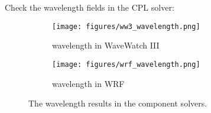 
Check the wavelength fields in the CPL solver:

\begin{figure}[h!]
\centering
  \begin{subfigure}[b]{0.4\linewidth}
  \texttt{[image: figures/ww3\_wavelength.png]}
  \caption{wavelength in WaveWatch III}
  \end{subfigure}
  \begin{subfigure}[b]{0.4\linewidth}
  \texttt{[image: figures/wrf\_wavelength.png]}
  \caption{wavelength in WRF}
  \end{subfigure}
\caption{The wavelength results in the component solvers.}
\label{fig:wl}
\end{figure}
